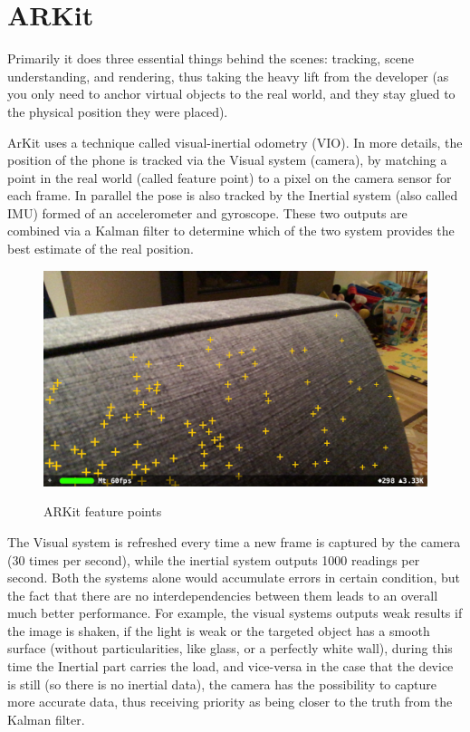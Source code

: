 \documentclass[12 pct]{report}
\begin{document}
\section{ARKit}
Primarily it does three essential things behind the scenes: tracking, scene understanding, and rendering, thus taking the heavy lift from the developer (as you only need to anchor virtual objects to the real world, and they stay glued to the physical position they were placed).

ArKit uses a technique called visual-inertial odometry (VIO). In more details, the position of the phone is tracked via the Visual system (camera), by matching a point in the real world (called feature point) to a pixel on the camera sensor for each frame. In parallel the pose is also tracked by the Inertial system  (also called IMU) formed of an accelerometer and gyroscope. These two outputs are combined via a Kalman filter to determine which of the two system provides the best estimate of the real position.

\begin{figure}[]
\includegraphics[width=1\textwidth]{feature-points}
\centering
\label{fig:feature-points}
\caption{ARKit feature points}
\end{figure}


The Visual system is refreshed every time a new frame is captured by the camera (30 times per second), while the inertial system outputs 1000 readings per second. Both the systems alone would accumulate errors in certain condition, but the fact that there are no interdependencies between them leads to an overall much better performance. For example, the visual systems outputs weak results if the image is shaken, if the light is weak or the targeted object has a smooth surface (without particularities, like glass, or a perfectly white wall), during this time the Inertial part carries the load, and vice-versa in the case that the device is still (so there is no inertial data), the camera has the possibility to capture more accurate data, thus receiving priority as being closer to the truth from the Kalman filter.
\end{document}
